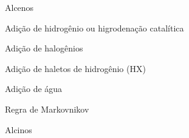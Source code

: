 \documentclass{beamer}
\begin{document}
\begin{frame}[label={sec:orga5b7f18}]{Alcenos}
\begin{block}{Adição de hidrogênio ou higrodenação catalítica}
\end{block}


\begin{block}{Adição de halogênios}
\end{block}



\begin{block}{Adição de haletos de hidrogênio (HX)}
\end{block}


\begin{block}{Adição de água}
\end{block}


\begin{block}{Regra de Markovnikov}
\end{block}
\end{frame}


\begin{frame}[label={sec:orgc989127}]{Alcinos}
\end{frame}
\end{document}
